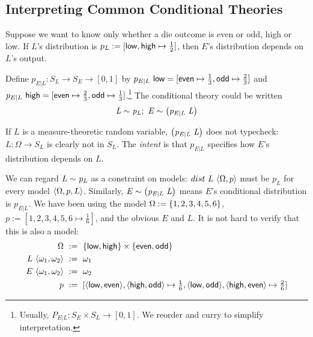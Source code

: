 \subsection{Interpreting Common Conditional Theories}

\newcommand{\CurryingNote}{Usually, $P_{E|L} : S_E \times S_L \to [0,1]$. We reorder and curry to simplify interpretation.}

\newcommand{\SimNote}{There are other ways to specify conditional distributions. We interpret ``$\sim$'' notation because we can do so unambiguously.}

\begin{example}
\label{example:conditional-theory}
Suppose we want to know only whether a die outcome is even or odd, high or low. If $L$'s distribution is $p_L := [\mathsf{low},\mathsf{high} \mapsto \tfrac{1}{2}]$, then $E$'s distribution depends on $L$'s output.

Define $p_{E|L} : S_L \to S_E \to [0,1]$ by ${p_{E|L}}\ {\mathsf{low}} = [\mathsf{even} \mapsto \tfrac{1}{3}, \mathsf{odd} \mapsto \tfrac{2}{3}]$ and ${p_{E|L}}\ {\mathsf{high}} = [\mathsf{even} \mapsto \tfrac{2}{3}, \mathsf{odd} \mapsto \tfrac{1}{3}]$.\footnote{\CurryingNote} The conditional theory could be written
\begin{equation}
	\objlang{L \sim p_L};\ \objlang{E \sim \papp {p_{E|L}} L}
\label{eqn:die-theory}
\end{equation}

If $L$ is a measure-theoretic random variable, $\mathit{\left({p_{E|L}}\ {L}\right)}$ does not typecheck: $L : \Omega \to S_L$ is clearly not in $S_L$. The \textit{intent} is that $p_{E|L}$ specifies how $E$'s distribution depends on $L$.
\exampleqed
\end{example}

We can regard $\mathit{L \sim p_L}$ as a constraint on models: ${dist}\ {L}\ {\langle{\Omega,p}\rangle}$ must be $p_L$ for every model $\langle{\Omega,p,L}\rangle$. Similarly, $\mathit{E \sim \left({p_{E|L}}\ {L}\right)}$ means $E$'s conditional distribution is $p_{E|L}$. We have been using the model $\Omega := \{{1,2,3,4,5,6}\}$, $p := [1,2,3,4,5,6 \mapsto \tfrac{1}{6}]$, and the obvious $E$ and $L$. It is not hard to verify that this is also a model:
\begin{equation}
\begin{split}
	\Omega&\ :=\ \{{\mathsf{low},\mathsf{high}}\} \times \{{\mathsf{even},\mathsf{odd}}\}
\\
	L~\langle{\omega_1,\omega_2}\rangle&\ :=\ \omega_1
\\
	E~\langle{\omega_1,\omega_2}\rangle&\ :=\ \omega_2
\\
	p&\ :=\ [\langle{\mathsf{low},\mathsf{even}}\rangle,\langle{\mathsf{high},\mathsf{odd}}\rangle \mapsto \tfrac{1}{6}, \langle{\mathsf{low},\mathsf{odd}}\rangle,\langle{\mathsf{high},\mathsf{even}}\rangle \mapsto \tfrac{2}{6}]
\end{split}
\label{eqn:other-model}
\end{equation}


